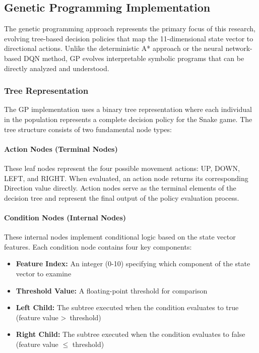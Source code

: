 \documentclass[a4paper,12pt]{article}
\begin{document}
\subsection{Genetic Programming Implementation}

The genetic programming approach represents the primary focus of this research, evolving tree-based decision policies that map the 11-dimensional state vector to directional actions. Unlike the deterministic A* approach or the neural network-based DQN method, GP evolves interpretable symbolic programs that can be directly analyzed and understood.

\subsubsection{Tree Representation}

The GP implementation uses a binary tree representation where each individual in the population represents a complete decision policy for the Snake game. The tree structure consists of two fundamental node types:

\paragraph{Action Nodes (Terminal Nodes)} These leaf nodes represent the four possible movement actions: UP, DOWN, LEFT, and RIGHT. When evaluated, an action node returns its corresponding Direction value directly. Action nodes serve as the terminal elements of the decision tree and represent the final output of the policy evaluation process.

\paragraph{Condition Nodes (Internal Nodes)} These internal nodes implement conditional logic based on the state vector features. Each condition node contains four key components:
\begin{itemize}
   \item \textbf{Feature Index:} An integer (0-10) specifying which component of the state vector to examine
   \item \textbf{Threshold Value:} A floating-point threshold for comparison
   \item \textbf{Left Child:} The subtree executed when the condition evaluates to true (feature value \textgreater~threshold)
   \item \textbf{Right Child:} The subtree executed when the condition evaluates to false (feature value $\le$ threshold)
\end{itemize}
\end{document}
